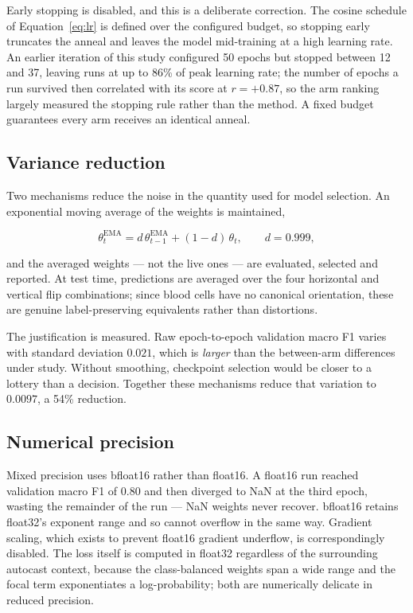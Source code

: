 \documentclass[11pt,a4paper]{article}
\begin{document}
Early stopping is disabled, and this is a deliberate correction. The cosine
schedule of Equation~\eqref{eq:lr} is defined over the configured budget, so
stopping early truncates the anneal and leaves the model mid-training at a high
learning rate. An earlier iteration of this study configured 50 epochs but
stopped between 12 and 37, leaving runs at up to 86\% of peak learning rate; the
number of epochs a run survived then correlated with its score at $r = +0.87$,
so the arm ranking largely measured the stopping rule rather than the method. A
fixed budget guarantees every arm receives an identical anneal.

\subsection{Variance reduction}

Two mechanisms reduce the noise in the quantity used for model selection. An
exponential moving average of the weights is maintained,

\begin{equation}
  \theta^{\text{EMA}}_t = d\,\theta^{\text{EMA}}_{t-1} + (1-d)\,\theta_t,
  \qquad d = 0.999,
  \label{eq:ema}
\end{equation}

and the averaged weights --- not the live ones --- are evaluated, selected and
reported. At test time, predictions are averaged over the four horizontal and
vertical flip combinations; since blood cells have no canonical orientation,
these are genuine label-preserving equivalents rather than distortions.

The justification is measured. Raw epoch-to-epoch validation macro F1 varies with
standard deviation $0.021$, which is \emph{larger} than the between-arm
differences under study. Without smoothing, checkpoint selection would be closer
to a lottery than a decision. Together these mechanisms reduce that variation to
$0.0097$, a 54\% reduction.

\subsection{Numerical precision}

Mixed precision uses bfloat16 rather than float16. A float16 run reached
validation macro F1 of $0.80$ and then diverged to NaN at the third epoch,
wasting the remainder of the run --- NaN weights never recover. bfloat16 retains
float32's exponent range and so cannot overflow in the same way. Gradient
scaling, which exists to prevent float16 gradient underflow, is correspondingly
disabled. The loss itself is computed in float32 regardless of the surrounding
autocast context, because the class-balanced weights span a wide range and the
focal term exponentiates a log-probability; both are numerically delicate in
reduced precision.
\end{document}
